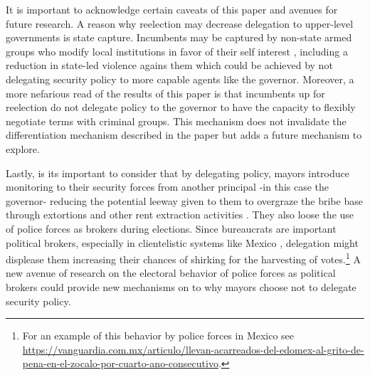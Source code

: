 It is important to acknowledge certain caveats of this paper and avenues for future research. A reason why reelection may decrease delegation to upper-level governments is state capture. %
Incumbents may be captured by non-state armed groups who modify local institutions in favor of their self interest \citep{ch_etal_2018}, including a reduction in state-led violence agains them which could be achieved by not delegating security policy to more capable agents like the governor.  Moreover, a more nefarious read of the results of this paper is that incumbents up for reelection  do not delegate policy to the governor to have the capacity to flexibly negotiate terms with criminal groups. This mechanism does not invalidate the differentiation mechanism described in the paper but adds a future mechanism to explore. 

Lastly, is its important to consider that by delegating policy, mayors introduce monitoring to their security forces from another principal -in this case the governor- reducing the potential leeway given to them to overgraze the bribe base through extortions and other rent extraction activities \citep{schleifer_vishny_1993}. They also loose the use of police forces as brokers during elections. Since bureaucrats are important political brokers, especially in clientelistic systems like Mexico \citep{larreguy_etal_2017}, delegation might displease them increasing their chances of shirking for the harvesting of votes.\footnote{For an example of this behavior by police forces in Mexico see \url{https://vanguardia.com.mx/articulo/llevan-acarreados-del-edomex-al-grito-de-pena-en-el-zocalo-por-cuarto-ano-consecutivo}.} A new avenue of research on the electoral behavior of police forces as political brokers could provide new mechanisms on to why mayors choose not to delegate security policy.
           


\clearpage
   
